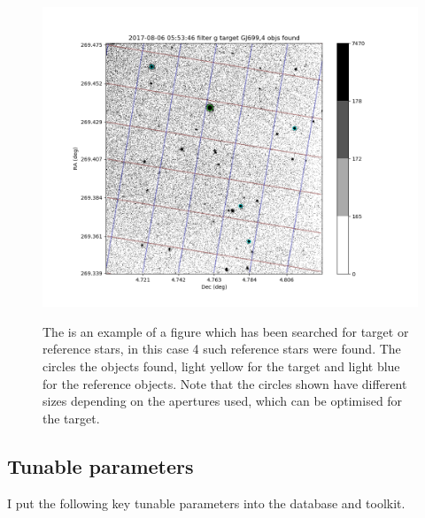\begin{figure}[!htbp]
\begin{center}
\includegraphics[scale=0.5]{images/bsgeg4obj.png} \\
\end{center}   
\caption{The is an example of a figure which has been searched for target or reference stars, in this case 4 such
  reference stars were found. The circles the objects found, light yellow for the target and light blue for the reference
  objects. Note that the circles shown have different sizes depending on the apertures used, which can be optimised for
  the target.}
\protect\label{fig:bsgeg4obj}
\end{figure}

\subsection{Tunable parameters}
\protect\label{section:tunable}

I put the following key tunable parameters into the database and toolkit.

